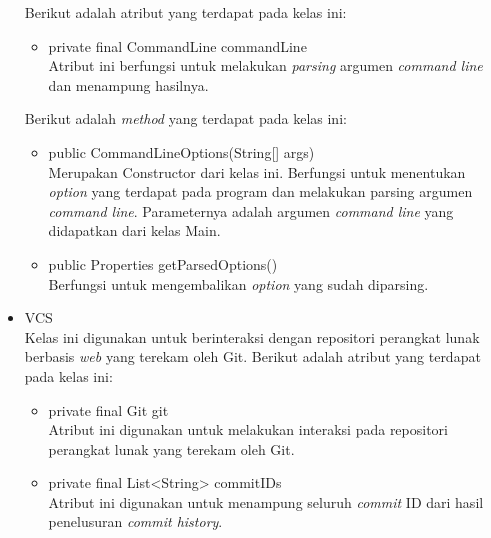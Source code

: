 \begin{itemize}
Berikut adalah atribut yang terdapat pada kelas ini:
\begin{itemize}
    \item private final CommandLine commandLine\\
    Atribut ini berfungsi untuk melakukan \textit{parsing} argumen \textit{command line} dan menampung hasilnya. 
\end{itemize}
Berikut adalah \textit{method} yang terdapat pada kelas ini:
\begin{itemize}
\item public CommandLineOptions(String[] args)\\
Merupakan Constructor dari kelas ini. Berfungsi untuk menentukan \textit{option} yang terdapat pada program dan melakukan parsing argumen \textit{command line}. Parameternya adalah argumen \textit{command line} yang didapatkan dari
kelas Main.
\item public Properties getParsedOptions()\\
Berfungsi untuk mengembalikan \textit{option} yang sudah diparsing.
\end{itemize}

\item VCS\\
Kelas ini digunakan untuk berinteraksi dengan repositori perangkat lunak berbasis \textit{web} yang terekam oleh Git. Berikut adalah atribut yang terdapat pada kelas ini:
\begin{itemize}
   \item  private final Git git\\
   Atribut ini digunakan untuk melakukan interaksi pada repositori perangkat lunak yang terekam oleh Git.
   \item private final List<String> commitIDs\\
   Atribut ini digunakan untuk menampung seluruh \textit{commit} ID dari hasil penelusuran \textit{commit history}.   
\end{itemize}


\end{itemize}
